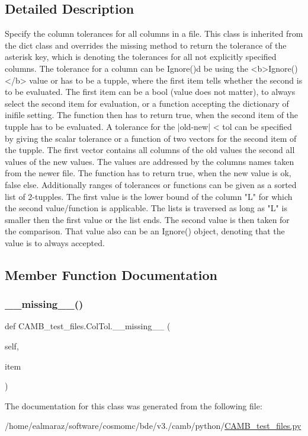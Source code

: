 \subsection{Detailed Description}
\begin{DoxyVerb}Specify the column tolerances for all columns in a file.
 This class is inherited from the dict class and overrides the missing
 method to return the tolerance of the asterisk key, which is denoting
 the tolerances for all not explicitly specified columns. The
 tolerance for a column can be Ignore()d be using the <b>Ignore()</b> value or
 has to be a tupple, where the first item tells whether the second is to
 be evaluated. The first item can be a bool (value does not matter), to always
 select the second item for evaluation, or a function accepting the
 dictionary of inifile setting. The function then has to return true,
 when the second item of the tupple has to be evaluated.
 A tolerance for the |old-new| < tol can be specified by giving the
 scalar tolerance or a function of two vectors for the second item of
 the tupple. The first vector contains all columns of the old values
 the second all values of the new values. The values are addressed by
 the columns names taken from the newer file. The function has to return
 true, when the new value is ok, false else.
 Additionally ranges of tolerances or functions can be given as a sorted
 list of 2-tupples. The first value is the lower bound of the column "L" for
 which the second value/function is applicable. The lists is traversed as
 long as "L" is smaller then the first value or the list ends. The second
 value is then taken for the comparison. That value also can be an Ignore()
 object, denoting that the value is to always accepted.
\end{DoxyVerb}
 

\subsection{Member Function Documentation}
\mbox{\label{classCAMB__test__files_1_1ColTol_a97517c5957bda898ef93ffe971715f22}} 
\subsubsection{\texorpdfstring{\+\_\+\+\_\+missing\+\_\+\+\_\+()}{\_\_missing\_\_()}}
{\footnotesize\ttfamily def C\+A\+M\+B\+\_\+test\+\_\+files.\+Col\+Tol.\+\_\+\+\_\+missing\+\_\+\+\_\+ (\begin{DoxyParamCaption}\item[{}]{self,  }\item[{}]{item }\end{DoxyParamCaption})}



The documentation for this class was generated from the following file\+:\begin{DoxyCompactItemize}
\item 
/home/ealmaraz/software/cosmomc/bde/v3./camb/python/\mbox{\hyperlink{CAMB__test__files_8py}{C\+A\+M\+B\+\_\+test\+\_\+files.\+py}}\end{DoxyCompactItemize}
